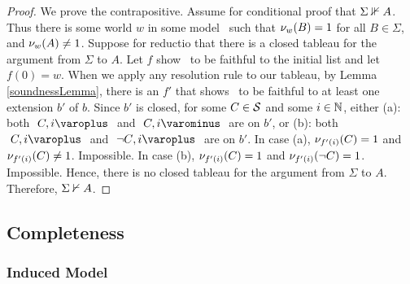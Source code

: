 \begin{proof}
We prove the contrapositive. 
	Assume for conditional proof that $ { \Sigma }\nVdash{ A } $. 
		Thus there is some world $ w $ in some model \Model\ such that 
		  $ \mathcal{\nu}_{ w }({ B }) = 1 $ for all $ B \in \Sigma $, and 
		  $ \mathcal{\nu}_{ w }({ A }) \neq 1 $. 
		Suppose for reductio that there is a closed tableau for the argument from $ \Sigma $ to $ A $. 
			Let $ f $ show \Model\ to be faithful to the initial list and let $ f( 0 ) = w $. 
			When we apply any resolution rule to our tableau, by Lemma \ref{soundnessLemma}, there is an $ f' $ that shows \Model\ to be faithful to at least one extension $ b' $ of $ b $. 
			Since $ b' $ is closed, for some $ C \in \mathcal{S} $ and some $ i \in \mathbb{N} $, either 
			  (a): both $ \like{ \dNode{ C }{ i }} $ and $ \like{ \uNode{ C }{ i }}$ are on $ b' $, or
			  (b): both $ \like{ \dNode{ C }{ i }} $ and $ \like{ \dNode{ \neg C }{ i }}$ are on $ b' $.
			  	In case (a), $ \mathcal{\nu}_{ f'( i ) }({ C }) = 1 $ and $ \mathcal{\nu}_{ f'( i ) }({ C }) \neq 1 $. Impossible.
				In case (b), $ \mathcal{\nu}_{ f'( i ) }({ C }) = 1 $ and $ \mathcal{\nu}_{ f'( i ) }({ \neg C }) = 1$. Impossible. 
		Hence, there is no closed tableau for the argument from $ \Sigma $ to $ A $. 
	Therefore, $ { \Sigma }\nvdash{ A }$.
\end{proof}


\subsection{Completeness}

\subsubsection{Induced Model}

